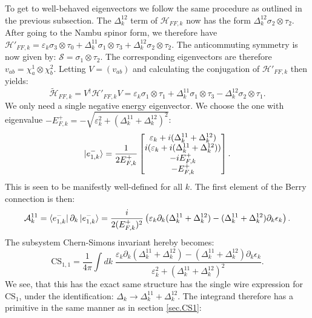 To get to well-behaved eigenvectors we follow the same procedure as outlined in the previous subsection. The $\Delta^{12}_k$ term of $\mathcal{H}_{FF,k}$ now has the form $\Delta^{12}_k \sigma_2 \otimes \tau_2$. After going to the Nambu spinor form, we therefore have $\mathcal{H}'_{FF,k} = \varepsilon_k \sigma_3 \otimes \tau_0 + \Delta^{11}_k \sigma_1 \otimes \tau_3 + \Delta^{12}_k \sigma_2 \otimes \tau_2$. The anticommuting symmetry is now given by: $\mathcal{S} = \sigma_1\otimes \tau_2$. The corresponding eigenvectors are therefore $v_{ab} = \chi^{1}_a\otimes\chi^{2}_b$. Letting $V = (v_{ab})$ and calculating the conjugation of $\mathcal{H}'_{FF,k}$ then yields:
\begin{equation}
\tilde{\mathcal{H}}_{FF,k} = V^\dagger\mathcal{H}'_{FF,k}V = \varepsilon_k \sigma_1\otimes \tau_1 + \Delta^{11}_k \sigma_1\otimes\tau_3 - \Delta^{12}_k\sigma_2\otimes\tau_1. \nonumber 
\end{equation}
We only need a single negative energy eigenvector. We choose the one with eigenvalue $-E^+_{F,k} = -\sqrt{\varepsilon_k^2 + (\Delta^{11}_k + \Delta^{12}_k)^2}$: 
\begin{equation}
\ket{e^{-}_{1,k}} = \frac{1}{2E^{+}_{F,k}}\begin{bmatrix} \varepsilon_k + i(\Delta^{11}_k + \Delta^{12}_k) \\ i(\varepsilon_k + i(\Delta^{11}_k + \Delta^{12}_k)) \\ -iE^{+}_{F,k} \\ -E^{+}_{F,k} \end{bmatrix}. \nonumber
\end{equation}
This is seen to be manifestly well-defined for all $k$. The first element of the Berry connection is then:
\begin{equation}
\mathcal{A}^{11}_k = \bra{e^{-}_{1,k}}\partial_k\ket{e^{-}_{1,k}} = \frac{i}{2(E^{+}_{F,k})^2}\left(\varepsilon_k\partial_k(\Delta^{11}_k + \Delta^{12}_k) - (\Delta^{11}_k + \Delta^{12}_k)\partial_k \epsilon_k\right). \nonumber
\end{equation}
The subsystem Chern-Simons invariant hereby becomes: 
\begin{equation}
\text{CS}_{1,1} = \frac{1}{4\pi}\int dk \; \frac{\varepsilon_k\partial_k(\Delta^{11}_k + \Delta^{12}_k) - (\Delta^{11}_k + \Delta^{12}_k)\partial_k \epsilon_k}{\varepsilon_k^2 + (\Delta^{11}_k + \Delta^{12}_k)^2}. 
\label{eq.CS11integralform}
\end{equation}
We see, that this has the exact same structure has the single wire expression for $\text{CS}_{1}$, under the identification: $\Delta_k \to \Delta^{11}_k + \Delta^{12}_k$. The integrand therefore has a primitive in the same manner as in section \ref{sec.CS1}:
